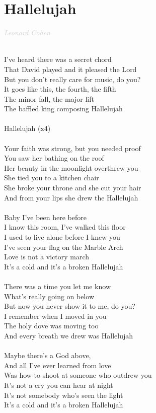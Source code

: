 \documentclass[a5paper, 10pt]{book}
\begin{document}
\section{Hallelujah}\textcolor{lightgray}{\textit{Leonard Cohen}}\\~\\
\begin{minipage}[t]{0.8\textwidth}
I've heard there was a secret chord\\
That David played and it pleased the Lord\\
But you don't really care for music, do you?\\
It goes like this, the fourth, the fifth\\
The minor fall, the major lift\\
The baffled king composing Hallelujah\\
\\
\hspace*{6mm}Hallelujah (x4)\\
\\
Your faith was strong, but you needed proof\\
You saw her bathing on the roof\\
Her beauty in the moonlight overthrew you\\
She tied you to a kitchen chair\\
She broke your throne and she cut your hair\\
And from your lips she drew the Hallelujah\\
\\
Baby I've been here before\\
I know this room, I've walked this floor\\
I used to live alone before I knew you\\
I've seen your flag on the Marble Arch\\
Love is not a victory march\\
It's a cold and it's a broken Hallelujah\\
\\
There was a time you let me know\\
What's really going on below\\
But now you never show it to me, do you?\\
I remember when I moved in you\\
The holy dove was moving too\\
And every breath we drew was Hallelujah\\
\\
Maybe there's a God above,\\
And all I've ever learned from love\\
Was how to shoot at someone who outdrew you\\
It's not a cry you can hear at night\\
It's not somebody who's seen the light\\
It's a cold and it's a broken Hallelujah\\

\end{minipage}
\end{document}
